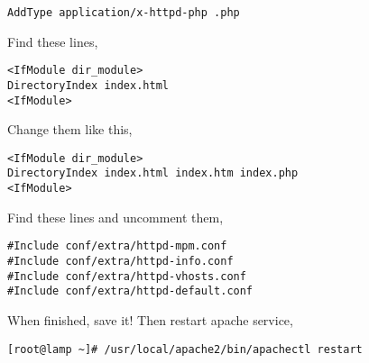 \small{
\begin{verbatim}
AddType application/x-httpd-php .php
\end{verbatim}
}
\normalsize

Find these lines,

\small{
\begin{verbatim}
<IfModule dir_module>
DirectoryIndex index.html
<IfModule>
\end{verbatim}
}
\normalsize

Change them like this,

\small{
\begin{verbatim}
<IfModule dir_module>
DirectoryIndex index.html index.htm index.php
<IfModule>
\end{verbatim}
}
\normalsize

Find these lines and uncomment them,

\small{
\begin{verbatim}
#Include conf/extra/httpd-mpm.conf
#Include conf/extra/httpd-info.conf
#Include conf/extra/httpd-vhosts.conf
#Include conf/extra/httpd-default.conf
\end{verbatim}
}
\normalsize

When finished, save it! Then restart apache service,

\small{
\begin{verbatim}
[root@lamp ~]# /usr/local/apache2/bin/apachectl restart
\end{verbatim}
}
\normalsize

